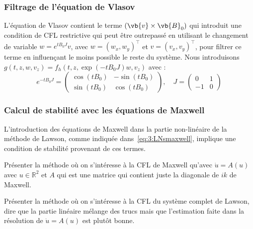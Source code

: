 \subsubsection{Filtrage de l'équation de Vlasov}

L'équation de Vlasov contient le terme $(\vb{v}\times\vb{B}_0)$ qui introduit une condition de CFL restrictive qui peut être outrepassé en utilisant le changement de variable $w=e^{tB_0J}v$, avec $w=(w_x,w_y)^\top$ et $v=(v_x,v_y)^\top$, pour filtrer ce terme en influençant le moins possible le reste du système. Nous introduisons $g(t,z,w,v_z) = f_h(t,z,\exp(-tB_0J)w,v_z)$ avec :
$$
  e^{-tB_0J} = \begin{pmatrix}
    \cos(tB_0) & -\sin(tB_0) \\
    \sin(tB_0) &  \cos(tB_0)
  \end{pmatrix},
  \quad
  J = \begin{pmatrix}
    0  & 1 \\
    -1 & 0
  \end{pmatrix}
$$



\subsubsection{Calcul de stabilité avec les équations de Maxwell}

L'introduction des équations de Maxwell dans la partie non-linéaire de la méthode de Lawson, comme indiquée dans~\eqref{eq:3:LNsmaxwell}, implique une condition de stabilité provenant de ces termes.

Présenter la méthode où on s'intéresse à la CFL de Maxwell qu'avec $\dot{u} = A(u)$ avec $u\in\mathbb{R}^2$ et $A$ qui est une matrice qui contient juste la diagonale de $ik$ de Maxwell.

Présenter la méthode où on s'intéresse à la CFL du système complet de Lawson, dire que la partie linéaire mélange des trucs mais que l'estimation faite dans la résolution de $\dot{u} = A(u)$ est plutôt bonne.

